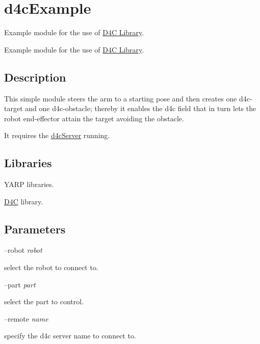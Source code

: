 \section{d4c\+Example}
\label{group__d4cExample}


Example module for the use of \hyperlink{group__d4c}{D4\+C Library}.  


Example module for the use of \hyperlink{group__d4c}{D4\+C Library}. 

\hypertarget{group__d4cServer_intro_sec}{}\subsection{Description}\label{group__d4cServer_intro_sec}
This simple module steers the arm to a starting pose and then creates one d4c-\/target and one d4c-\/obstacle; thereby it enables the d4c field that in turn lets the robot end-\/effector attain the target avoiding the obstacle.

It requires the \hyperlink{group__d4cServer}{d4c\+Server} running.\hypertarget{group__d4cServer_lib_sec}{}\subsection{Libraries}\label{group__d4cServer_lib_sec}

\begin{DoxyItemize}
\item Y\+A\+R\+P libraries.
\item \hyperlink{group__d4c}{D4\+C} library.
\end{DoxyItemize}\hypertarget{group__d4cServer_parameters_sec}{}\subsection{Parameters}\label{group__d4cServer_parameters_sec}
--robot {\itshape robot} 
\begin{DoxyItemize}
\item select the robot to connect to.
\end{DoxyItemize}

--part {\itshape part} 
\begin{DoxyItemize}
\item select the part to control.
\end{DoxyItemize}

--remote {\itshape name} 
\begin{DoxyItemize}
\item specify the d4c server name to connect to.
\end{DoxyItemize}

